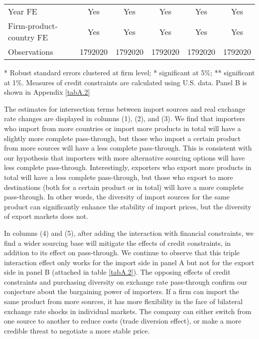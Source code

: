 \begin{table}[htbp]
\begin{threeparttable}
\begin{tabular}{lccccc}
		Year FE  & Yes   & Yes   & Yes   & Yes   & Yes \\
		Firm-product-country FE & Yes   & Yes   & Yes   & Yes   & Yes \\
		Observations & 1792020 & 1792020 & 1792020 & 1792020 & 1792020 \\
		\bottomrule
	\end{tabular}
	\begin{tablenotes}
	\footnotesize
	\item[*] Robust standard errors clustered at firm level; * significant at 5\%; ** significant at 1\%. Measures of credit constraints are calculated using U.S. data. Panel B is shown in Appendix \ref{tabA.2}
	\end{tablenotes}
	\end{threeparttable}
	\label{tab5.4}
\end{table}

The estimates for intersection terms between import sources and real exchange rate changes are displayed in columns (1), (2), and (3). We find that importers who import from more countries or import more products in total will have a slightly more complete pass-through, but those who import a certain product from more sources will have a less complete pass-through. This is consistent with our hypothesis that importers with more alternative sourcing options will have less complete pass-through. Interestingly, exporters who export more products in total will have a less complete pass-through, but those who export to more destinations (both for a certain product or in total) will have a more complete pass-through. In other words, the diversity of import sources for the same product can significantly enhance the stability of import prices, but the diversity of export markets does not.

In columns (4) and (5), after adding the interaction with financial constraints, we find a wider sourcing base will mitigate the effects of credit constraints, in addition to its effect on pass-through. We continue to observe that this triple interaction effect only works for the import side in panel A but not for the export side in panel B (attached in table \ref{tabA.2}). The opposing effects of credit constraints and purchasing diversity on exchange rate pass-through confirm our conjecture about the bargaining power of importers. If a firm can import the same product from more sources, it has more flexibility in the face of bilateral exchange rate shocks in individual markets. The company can either switch from one source to another to reduce costs (trade diversion effect), or make a more credible threat to negotiate a more stable price.

